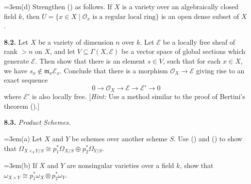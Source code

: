 {\noindent\hangindent=3em\hspace*{1.7em}(d) Strengthen () as follows. If $X$ is a variety over an algebraically closed field $k$, then $U=\{x\in X\mid\mathcal O_x\text{ is a regular local ring}\}$ is an open dense subset of $X$.

\smallskip
\noindent\hypertarget{ex-II-8.2}{}\textbf{8.2.} Let $X$ be a variety of dimension $n$ over $k$. Let $\mathcal E$ be a locally free sheaf of rank $>n$ on $X$, and let $V\subseteq\Gamma(X,\mathcal E)$ be a vector space of global sections which generate $\mathcal E$. Then show that there is an element $s\in V$, such that for each $x\in X$, we have $s_x\notin\mathfrak m_x\mathcal E_x$. Conclude that there is a morphism $\mathcal O_X\to\mathcal E$ giving rise to an exact sequence
\[
0\longrightarrow\mathcal O_X\longrightarrow\mathcal E\longrightarrow\mathcal E'\longrightarrow0
\]
where $\mathcal E'$ is also locally free. [\emph{Hint:} Use a method similar to the proof of Bertini's theorem ().]

\smallskip
\noindent\hypertarget{ex-II-8.3}{}\textbf{8.3.} \emph{Product Schemes.}

\noindent\hangindent=3em\hspace*{1.7em}(a) Let $X$ and $Y$ be schemes over another scheme $S$. Use () and () to show that $\Omega_{X\times_S Y/S}\cong p_1^*\Omega_{X/S}\oplus p_2^*\Omega_{Y/S}$.

\noindent\hangindent=3em\hspace*{1.7em}(b) If $X$ and $Y$ are nonsingular varieties over a field $k$, show that $\omega_{X\times Y}\cong p_1^*\omega_X\otimes p_2^*\omega_Y$.}
